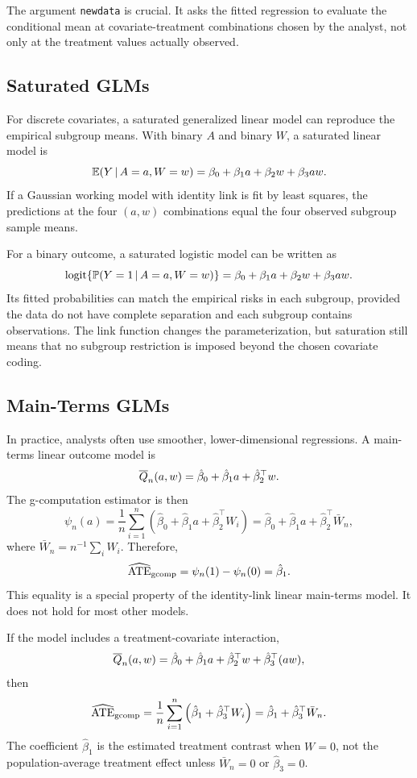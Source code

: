 The argument \texttt{newdata} is crucial. It asks the fitted regression to evaluate
the conditional mean at covariate-treatment combinations chosen by the analyst, not
only at the treatment values actually observed.

\subsection{Saturated GLMs}

For discrete covariates, a saturated generalized linear model can reproduce the
empirical subgroup means. With binary $A$ and binary $W$, a saturated linear model is
\[
\mathbb{E}(Y\,\vert\, A=a,W=w)
=
\beta_0+\beta_1a+\beta_2w+\beta_3aw.
\]
If a Gaussian working model with identity link is fit by least squares, the predictions
at the four $(a,w)$ combinations equal the four observed subgroup sample means.

For a binary outcome, a saturated logistic model can be written as
\[
\operatorname{logit}\{\mathbb{P}(Y=1\,\vert\, A=a,W=w)\}
=
\beta_0+\beta_1a+\beta_2w+\beta_3aw.
\]
Its fitted probabilities can match the empirical risks in each subgroup, provided the
data do not have complete separation and each subgroup contains observations. The
link function changes the parameterization, but saturation still means that no
subgroup restriction is imposed beyond the chosen covariate coding.

\subsection{Main-Terms GLMs}

In practice, analysts often use smoother, lower-dimensional regressions. A main-terms
linear outcome model is
\[
\overline{Q}_n(a,w)=\hat\beta_0+\hat\beta_1 a+\hat\beta_2^\top w.
\]
The g-computation estimator is then
\[
\psi_n(a)
=
\frac{1}{n}\sum_{i=1}^n
\left(\hat\beta_0+\hat\beta_1 a+\hat\beta_2^\top W_i\right)
=
\hat\beta_0+\hat\beta_1 a+\hat\beta_2^\top \bar W_n,
\]
where $\bar W_n=n^{-1}\sum_i W_i$. Therefore,
\[
\widehat{\operatorname{ATE}}_{\mathrm{gcomp}}
=
\psi_n(1)-\psi_n(0)
=
\hat\beta_1.
\]
This equality is a special property of the identity-link linear main-terms model. It
does not hold for most other models.

If the model includes a treatment-covariate interaction,
\[
\overline{Q}_n(a,w)=\hat\beta_0+\hat\beta_1 a+\hat\beta_2^\top w+\hat\beta_3^\top(aw),
\]
then
\[
\widehat{\operatorname{ATE}}_{\mathrm{gcomp}}
=
\frac{1}{n}\sum_{i=1}^n
\left(\hat\beta_1+\hat\beta_3^\top W_i\right)
=
\hat\beta_1+\hat\beta_3^\top \bar W_n.
\]
The coefficient $\hat\beta_1$ is the estimated treatment contrast when $W=0$, not the
population-average treatment effect unless $\bar W_n=0$ or $\hat\beta_3=0$.

